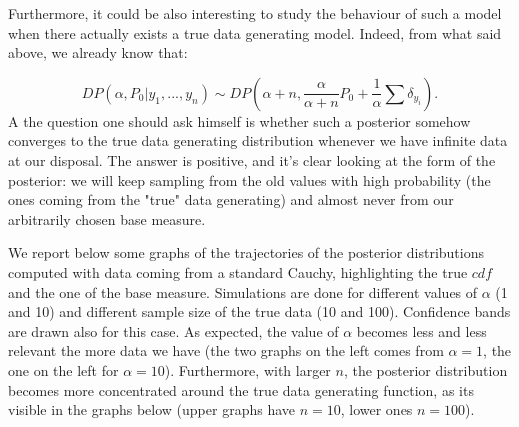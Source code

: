 \documentclass{article}
\begin{document}
Furthermore, it could be also interesting to study the behaviour of such a model when there actually exists a true data generating model. Indeed, from what said above, we already know that:

$$ DP(\alpha, P_0 | y_1,..., y_n) \sim DP(\alpha+n, \frac{\alpha}{\alpha+n} P_0+ \frac{1}{\alpha} \sum \delta_{y_i}).$$
A the question one should ask himself is whether such a posterior somehow converges to the true data generating distribution whenever we have infinite data at our disposal. The answer is positive, and it's clear looking at the form of the posterior: we will keep sampling from the old values with high probability (the ones coming from the "true" data generating) and almost never from our arbitrarily chosen base measure.

We report below some graphs of the trajectories of the posterior distributions computed with data coming from a standard Cauchy, highlighting the true $\textit{cdf}$ and the one of the base measure. Simulations are done for different values of $\alpha$ (1 and 10) and different sample size of the true data (10 and 100). Confidence bands are drawn also for this case.
As expected, the value of $\alpha$ becomes less and less relevant the more data we have (the two graphs on the left comes from $\alpha=1$, the one on the left for $\alpha = 10$). Furthermore, with larger $n$, the posterior distribution becomes more concentrated around the true data generating function, as its visible in the graphs below (upper graphs have $n=10$, lower ones $n=100$).
\end{document}
